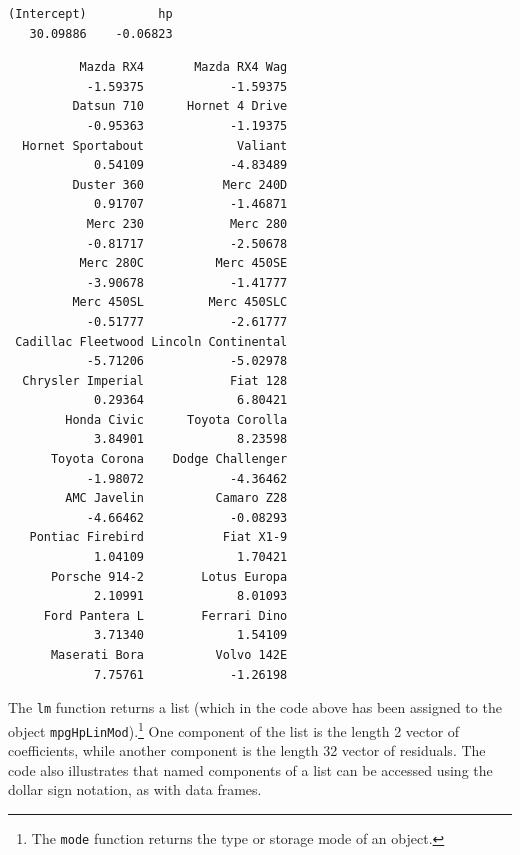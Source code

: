 \documentclass[]{krantz}
\makeatletter
\newenvironment{Shaded}{\begin{snugshade}}{\end{snugshade}}
\newcommand{\StringTok}[1]{\textcolor[rgb]{0.5,0.5,0.5}{#1}}
\newcommand{\OperatorTok}[1]{\textcolor[rgb]{0.43,0.43,0.43}{\textbf{#1}}}
\newcommand{\NormalTok}[1]{#1}
\newenvironment{kframe}{%
\medskip{}
\setlength{\fboxsep}{.8em}
 \def\at@end@of@kframe{}%
 \ifinner\ifhmode%
  \def\at@end@of@kframe{\end{minipage}}%
  \begin{minipage}{\columnwidth}%
 \fi\fi%
 \def\FrameCommand##1{\hskip\@totalleftmargin \hskip-\fboxsep
 \colorbox{shadecolor}{##1}\hskip-\fboxsep
     \hskip-\linewidth \hskip-\@totalleftmargin \hskip\columnwidth}%
 \MakeFramed {\advance\hsize-\width
   \@totalleftmargin\z@ \linewidth\hsize
   \@setminipage}}%
 {\par\unskip\endMakeFramed%
 \at@end@of@kframe}
\renewenvironment{Shaded}{\begin{kframe}}{\end{kframe}}
\makeatother
\begin{document}
\begin{Shaded}
\end{Shaded}

\begin{verbatim}
(Intercept)          hp 
   30.09886    -0.06823 
\end{verbatim}

\begin{Shaded}
\end{Shaded}

\begin{verbatim}
          Mazda RX4       Mazda RX4 Wag 
           -1.59375            -1.59375 
         Datsun 710      Hornet 4 Drive 
           -0.95363            -1.19375 
  Hornet Sportabout             Valiant 
            0.54109            -4.83489 
         Duster 360           Merc 240D 
            0.91707            -1.46871 
           Merc 230            Merc 280 
           -0.81717            -2.50678 
          Merc 280C          Merc 450SE 
           -3.90678            -1.41777 
         Merc 450SL         Merc 450SLC 
           -0.51777            -2.61777 
 Cadillac Fleetwood Lincoln Continental 
           -5.71206            -5.02978 
  Chrysler Imperial            Fiat 128 
            0.29364             6.80421 
        Honda Civic      Toyota Corolla 
            3.84901             8.23598 
      Toyota Corona    Dodge Challenger 
           -1.98072            -4.36462 
        AMC Javelin          Camaro Z28 
           -4.66462            -0.08293 
   Pontiac Firebird           Fiat X1-9 
            1.04109             1.70421 
      Porsche 914-2        Lotus Europa 
            2.10991             8.01093 
     Ford Pantera L        Ferrari Dino 
            3.71340             1.54109 
      Maserati Bora          Volvo 142E 
            7.75761            -1.26198 
\end{verbatim}

The \texttt{lm} function returns a list (which in the code above has
been assigned to the object \texttt{mpgHpLinMod}).\footnote{The
  \texttt{mode} function returns the type or storage mode of an object.}
One component of the list is the length 2 vector of coefficients, while
another component is the length 32 vector of residuals. The code also
illustrates that named components of a list can be accessed using the
dollar sign notation, as with data frames.
\end{document}
